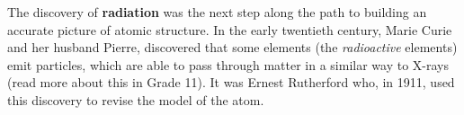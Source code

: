 \par
        \label{m38756*id254642}The discovery of \textbf{radiation} was the next step along the path to building an accurate picture of atomic structure. In the early twentieth century, Marie Curie and her husband Pierre,  discovered that some elements (the \textsl{radioactive} elements) emit particles, which are able to pass through matter in a similar way to X-rays (read more about this in Grade 11). It was Ernest Rutherford who, in 1911, used this discovery to revise the model of the atom.\par 
      \label{m38756*eip-956}
      \label{m38756*uid3}

